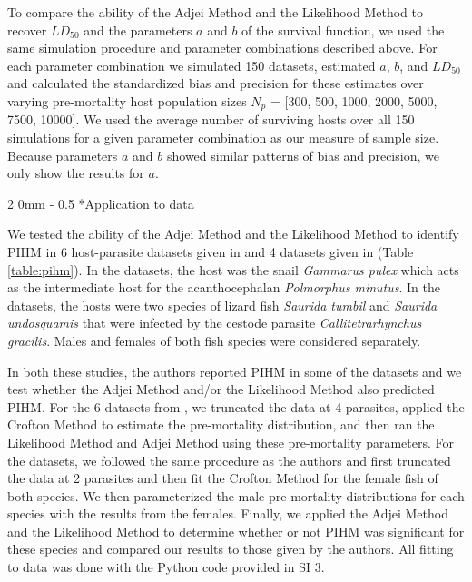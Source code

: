 \documentclass[12pt, a4paper]{article}
\makeatletter
\renewcommand{\subsection}{\@startsection
{subsection}%
{2}%
{0mm}%
{-\baselineskip}%
{0.5\baselineskip}%
{\normalfont\bf}} %
\makeatother
\begin{document}
To compare the ability of the Adjei Method and the Likelihood Method to recover $LD_{50}$ and the parameters $a$ and $b$ of the survival function, we used the same simulation procedure and parameter combinations described above. For each parameter
combination we simulated 150 datasets, estimated $a$, $b$, and $LD_{50}$ and calculated the standardized bias and
precision \citep{Walther2005} for these estimates over varying pre-mortality host population sizes  $N_p$ = [300, 500, 1000, 2000, 5000, 7500,
10000]. We used the average number of surviving hosts over all 150 simulations for a given parameter combination as our measure of sample size.  Because parameters $a$ and $b$ showed similar patterns of bias and precision, we only show the results for $a$.

\subsection*{Application to data}

We tested the ability of the Adjei Method and the Likelihood Method to identify
PIHM in 6 host-parasite datasets given in \cite{Crofton1971a} and 4 datasets
given in \cite{Adjei1986} (Table \ref{table:pihm}). In the \cite{Crofton1971a} datasets, the host was
the snail \emph{Gammarus pulex} which acts as the intermediate host for the
acanthocephalan \emph{Polmorphus minutus}. In the \cite{Adjei1986} datasets,
the hosts were two species of lizard fish \emph{Saurida tumbil} and
\emph{Saurida undosquamis} that were infected by the cestode parasite
\emph{Callitetrarhynchus gracilis}.  Males and females of both fish species
were considered separately.

In both these studies, the authors reported PIHM in some of the datasets and we test whether the Adjei
Method and/or the Likelihood Method also predicted PIHM. For the 6 datasets from
\cite{Crofton1971a}, we truncated the data at 4 parasites, applied the Crofton
Method to estimate the pre-mortality distribution, and then ran the Likelihood
Method and Adjei Method using these pre-mortality parameters.  For the
\cite{Adjei1986} datasets, we followed the same procedure as the authors and
first truncated the data at 2 parasites and then fit the Crofton Method for the
female fish of both species.  We then parameterized the male pre-mortality
distributions for each species with the results from the females.  Finally, we
applied the Adjei Method and the Likelihood Method to determine whether or not
PIHM was significant for these species and compared our results to those given by the authors.  All fitting to data was done with the Python code provided in SI 3.
\end{document}
